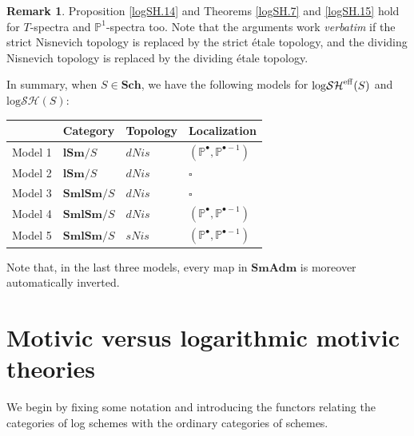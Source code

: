 \documentclass[11pt, a4paper]{amsart}
\theoremstyle{definition}
\newtheorem{rmk}[thm]{Remark}
\numberwithin{equation}{subsection}
\renewcommand{\P}{\mathbb{P}}
\newcommand{\Sch}{\mathbf{Sch}}
\newcommand{\lSm}{\mathbf{lSm}}
\newcommand{\SmlSm}{\mathbf{SmlSm}}
\newcommand{\SmAdm}{\mathbf{SmAdm}}
\newcommand{\boxx}{\square}
\newcommand{\eff}{{\rm eff}}
\newcommand{\inflogSH}{\mathrm{log}\mathcal{SH}}
\begin{document}
\begin{rmk} 
Proposition \ref{logSH.14} and Theorems \ref{logSH.7} and \ref{logSH.15} hold for $T$-spectra and $\P^1$-spectra too. Note that the arguments work \emph{verbatim} if the strict Nisnevich topology is replaced by the strict \'etale topology, and the dividing Nisnevich topology is replaced by the dividing \'etale topology.
 \end{rmk}


In summary, 
when $S\in \Sch$, 
we have the following models for $\inflogSH^\eff(S)$ and $\inflogSH(S)$:
\begin{center}
\begin{tabular}{l | lll}
&
Category&
Topology&
Localization
\\
\hline
Model 1 & $\lSm/S$ & $dNis$ & $(\P^\bullet,\P^{\bullet-1})$
\\
Model 2 & $\lSm/S$ & $dNis$ & $\boxx$
\\
Model 3 & $\SmlSm/S$ & $dNis$ & $\boxx$
\\
Model 4 & $\SmlSm/S$ & $dNis$ & $(\P^\bullet,\P^{\bullet-1})$
\\
Model 5 & $\SmlSm/S$ & $sNis$ & $(\P^\bullet,\P^{\bullet-1})$
\end{tabular}
\end{center}
Note that, in the last three models, every map in $\SmAdm$ is moreover automatically inverted.





\newpage




\section{Motivic versus logarithmic motivic theories}
\label{section:mvlmt}

We begin by fixing some notation and introducing the functors relating the categories of log schemes with the ordinary categories of schemes.
\end{document}
